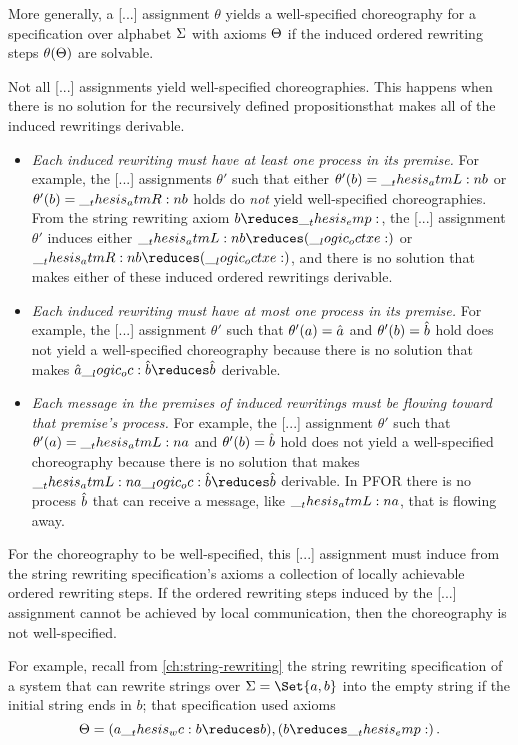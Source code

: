 More generally, a [...] assignment $\theta$ yields a well-specified choreography for a specification over alphabet $\Sigma$ with axioms $\Theta$ if the induced ordered rewriting steps $\theta(\Theta)$ are solvable.

Not all [...] assignments yield well-specified choreographies.
This happens when there is no solution for the recursively defined propositionsthat makes all of the induced rewritings derivable.
\begin{itemize}
\item
  \emph{Each induced rewriting must have at least one process in its premise.}
  For example, the [...] assignments $\theta'$ such that either $\theta'(b) = \__thesis_atmL:n {b}$ or $\theta'(b) = \__thesis_atmR:n {b}$ holds do \emph{not} yield well-specified choreographies.
  From the string rewriting axiom $b \reduces \emp$, the [...] assignment $\theta'$ induces either $\atmL{b} \reduces (\octxe)$ or $\atmR{b} \reduces (\octxe)$, and there is no solution that makes either of these induced ordered rewritings derivable.

\item
  \emph{Each induced rewriting must have at most one process in its premise.}
  For example, the [...] assignment $\theta'$ such that $\theta'(a) = \hat{a}$ and $\theta'(b) = \hat{b}$ hold does not yield a well-specified choreography because there is no solution that makes $\defp{a} \oc \defp{b} \reduces \defp{b}$ derivable.

\item
  \emph{Each message in the premises of induced rewritings must be flowing toward that premise's process.}
  For example, the [...] assignment $\theta'$ such that $\theta'(a) = \__thesis_atmL:n {a}$ and $\theta'(b) = \hat{b}$ hold does not yield a well-specified choreography because there is no solution that makes $\atmL{a} \oc \defp{b} \reduces \defp{b}$ derivable.
  In \ac{PFOR} there is no process $\hat{b}$ that can receive a message, like $\__thesis_atmL:n {a}$, that is flowing away.
\end{itemize}


For the choreography to be well-specified, this [...] assignment must induce from the string rewriting specification's axioms a collection of locally achievable  ordered rewriting steps.
If the ordered rewriting steps induced by the [...] assignment cannot be achieved by local communication, then the choreography is not well-specified.

For example, recall from \cref{ch:string-rewriting} the string rewriting specification of a system that can rewrite strings over $\sralph = \Set{a,b}$ into the empty string if the initial string ends in $b$;
that specification used axioms
\begin{equation*}
  \srsig = (a \wc b \reduces b) , (b \reduces \emp)
  \,.
\end{equation*}


